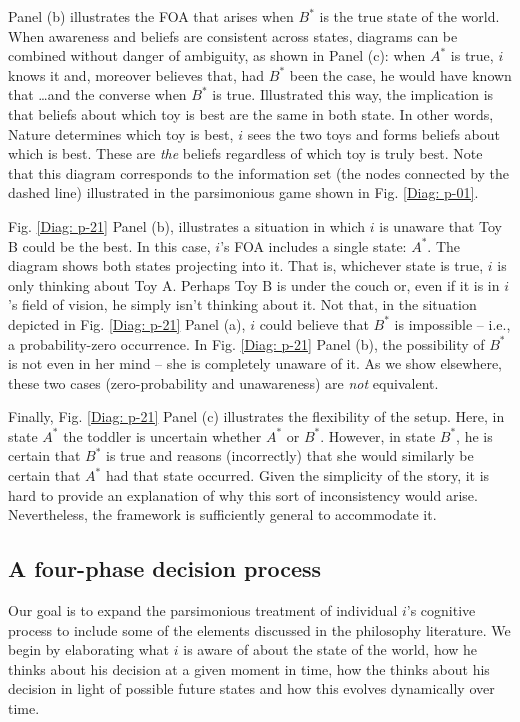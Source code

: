 \documentclass[
11pt,
titlepage,
reqno,
]{article}%
\theoremstyle{definition}
\begin{document}
Panel (b) illustrates the FOA that arises when $B^\ast$ is the true state of the world. When awareness and beliefs are consistent across states, diagrams can be combined without danger of ambiguity, as shown in Panel (c): when $A^\ast$ is true, $i$ knows it and, moreover believes that, had $B^\ast$ been the case, he would have known that \ldots and the converse when $B^\ast$ is true. Illustrated this way, the implication is that beliefs about which toy is best are the same in both state. In other words, Nature determines which toy is best, $i$ sees the two toys and forms beliefs about which is best. These are \textit{the} beliefs regardless of which toy is truly best. Note that this diagram corresponds to the information set (the nodes connected by the dashed line) illustrated in the parsimonious game shown in Fig. \ref{Diag: p-01}. 

Fig. \ref{Diag: p-21} Panel (b), illustrates a situation in which $i$ is unaware that Toy B could be the best. In this case, $i$'s FOA includes a single state: $A^\ast$. The diagram shows both states projecting into it. That is, whichever state is true, $i$ is only thinking about Toy A. Perhaps Toy B is under the couch or, even if it is in $i$'s field of vision, he simply isn't thinking about it. Not that, in the situation depicted in Fig. \ref{Diag: p-21} Panel (a), $i$ could believe that $B^\ast$ is impossible -- i.e., a probability-zero occurrence. In Fig. \ref{Diag: p-21} Panel (b), the possibility of $B^\ast$ is not even in her mind -- she is completely unaware of it. As we show elsewhere, these two cases (zero-probability and unawareness) are \textit{not} equivalent. 

Finally, Fig. \ref{Diag: p-21} Panel (c) illustrates the flexibility of the setup. Here, in state $A^\ast$ the toddler is uncertain whether $A^\ast$ or $B^\ast$. However, in state $B^\ast$, he is certain that $B^\ast$ is true and reasons (incorrectly) that she would similarly be certain that $A^\ast$ had that state occurred. Given the simplicity of the story, it is hard to provide an explanation of why this sort of inconsistency would arise. Nevertheless, the framework is sufficiently general to accommodate it.



\subsection{A four-phase decision process}
Our goal is to expand the parsimonious treatment of individual $i$'s cognitive process to include some of the elements discussed in the philosophy literature. We begin by elaborating what $i$ is aware of about the state of the world, how he thinks about his decision at a given moment in time, how the thinks about his decision in light of possible future states and how this evolves dynamically over time. 
\end{document}
